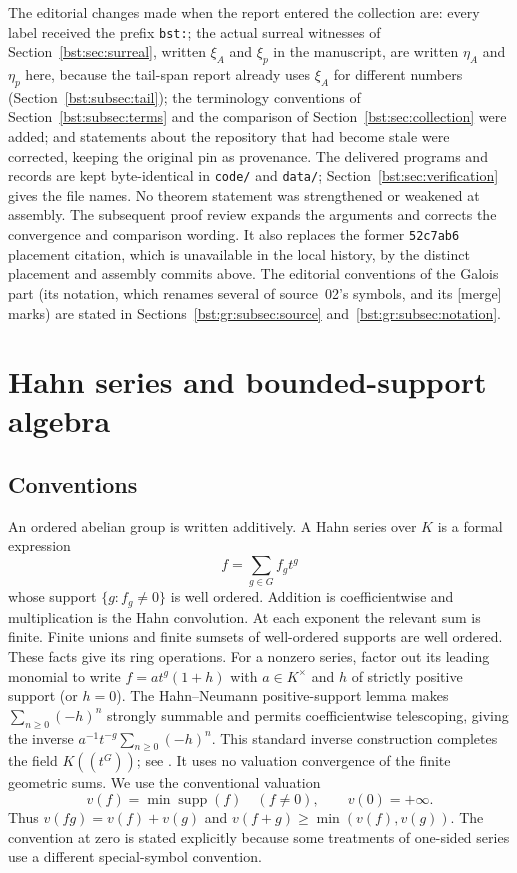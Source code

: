 \documentclass[11pt,letterpaper]{article}
\theoremstyle{definition}
\theoremstyle{remark}
\newcommand{\supp}{\operatorname{supp}}
\newcommand{\HH}[2]{#1((t^{#2}))}
\begin{document}
The editorial changes made when the report entered the collection are:
every label received the prefix \texttt{bst:}; the actual surreal witnesses
of Section~\ref{bst:sec:surreal}, written $\xi_A$ and $\xi_p$ in the manuscript,
are written $\eta_A$ and $\eta_p$ here, because the tail-span report already
uses $\xi_A$ for different numbers (Section~\ref{bst:subsec:tail}); the
terminology conventions of Section~\ref{bst:subsec:terms} and the comparison
of Section~\ref{bst:sec:collection} were added; and statements about the
repository that had become stale were corrected, keeping the original pin as
provenance. The delivered programs and records are kept byte-identical in
\texttt{code/} and \texttt{data/}; Section~\ref{bst:sec:verification} gives
the file names. No theorem statement was strengthened or weakened at assembly.
The subsequent proof review expands the arguments and corrects the
convergence and comparison wording. It also replaces the former
\texttt{52c7ab6} placement citation, which is unavailable in the local
history, by the distinct placement and assembly commits above.
The editorial conventions of the Galois part (its notation, which renames
several of source~02's symbols, and its \textup{[merge]} marks) are stated in
Sections~\ref{bst:gr:subsec:source} and~\ref{bst:gr:subsec:notation}.

\section{Hahn series and bounded-support algebra}\label{bst:sec:setup}

\subsection{Conventions}

An ordered abelian group is written additively. A Hahn series over $K$ is a
formal expression
\[
 f=\sum_{g\in G} f_g t^g
\]
whose support $\{g:f_g\ne0\}$ is well ordered. Addition is coefficientwise
and multiplication is the Hahn convolution. At each exponent the relevant
sum is finite. Finite unions and finite sumsets of well-ordered supports
are well ordered. These facts give its ring operations. For a nonzero
series, factor out its leading monomial to write $f=a t^g(1+h)$ with
$a\in K^\times$ and $h$ of strictly positive support (or $h=0$).
The Hahn--Neumann positive-support lemma makes $\sum_{n\ge0}(-h)^n$
strongly summable and permits coefficientwise telescoping, giving the
inverse $a^{-1}t^{-g}\sum_{n\ge0}(-h)^n$. This standard inverse
construction completes the field $\HH KG$; see \cite[Section~2.1]{LM24}.
It uses no valuation convergence of the finite geometric sums.
We use the conventional valuation
\[
 v(f)=\min\supp(f)\quad(f\ne0),\qquad v(0)=+\infty.
\]
Thus $v(fg)=v(f)+v(g)$ and $v(f+g)\ge\min(v(f),v(g))$.
The convention at zero is stated explicitly because some treatments of
one-sided series use a different special-symbol convention.
\end{document}
